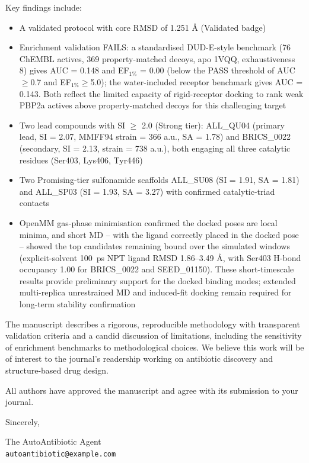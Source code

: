 \documentclass[12pt]{article}
\begin{document}
Key findings include:
\begin{itemize}
    \item A validated protocol with core RMSD of 1.251 \AA{} (Validated badge)
    \item Enrichment validation FAILS: a standardised DUD-E-style benchmark (76 ChEMBL actives, 369 property-matched decoys, apo 1VQQ, exhaustiveness 8) gives AUC = 0.148 and EF$_{1\%}$ = 0.00 (below the PASS threshold of AUC$\ge$0.7 and EF$_{1\%}$$\ge$5.0); the water-included receptor benchmark gives AUC = 0.143. Both reflect the limited capacity of rigid-receptor docking to rank weak PBP2a actives above property-matched decoys for this challenging target
    \item Two lead compounds with SI $\geq$ 2.0 (Strong tier): ALL\_QU04 (primary lead, SI = 2.07, MMFF94 strain = 366 a.u., SA = 1.78) and BRICS\_0022 (secondary, SI = 2.13, strain = 738 a.u.), both engaging all three catalytic residues (Ser403, Lys406, Tyr446)
    \item Two Promising-tier sulfonamide scaffolds ALL\_SU08 (SI = 1.91, SA = 1.81) and ALL\_SP03 (SI = 1.93, SA = 3.27) with confirmed catalytic-triad contacts
    \item OpenMM gas-phase minimisation confirmed the docked poses are local minima, and short MD -- with the ligand correctly placed in the docked pose -- showed the top candidates remaining bound over the simulated windows (explicit-solvent 100~ps NPT ligand RMSD 1.86--3.49 \AA{}, with Ser403 H-bond occupancy 1.00 for BRICS\_0022 and SEED\_01150). These short-timescale results provide preliminary support for the docked binding modes; extended multi-replica unrestrained MD and induced-fit docking remain required for long-term stability confirmation
\end{itemize}

The manuscript describes a rigorous, reproducible methodology with transparent validation criteria and a candid discussion of limitations, including the sensitivity of enrichment benchmarks to methodological choices. We believe this work will be of interest to the journal's readership working on antibiotic discovery and structure-based drug design.

All authors have approved the manuscript and agree with its submission to your journal.

Sincerely,

The AutoAntibiotic Agent\\
\texttt{autoantibiotic@example.com}
\end{document}
